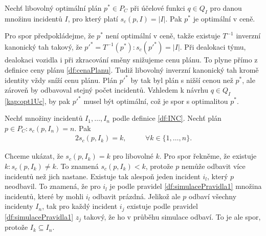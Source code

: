 \begin{veta}\label{veta:optPlanOptVCene}
  Nechť libovolný optimální plán $p^* \in P_C$ při účelové funkci $q \in Q_I$ pro danou množinu incidentů $I$, pro který platí $s_c(p, I) = |I|$.
  Pak $p^*$ je optimální v ceně.
\end{veta}
\begin{dukaz}
  Pro spor předpokládejme, že $p^*$ není optimální v ceně, takže existuje $T^{-1}$ inverzní kanonický tah takový, že $p'^* = T^{-1}(p^*) \colon s_c(p'^*) = |I|$.
  Při dealokaci týmu, dealokaci vozidla i při zkracování směny snižujeme cenu plánu. To plyne přímo z definice ceny plánu \ref{df:cenaPlanu}.
  Tudiž libovolný inverzní kanonický tah kromě identity vždy sníží cenu plánu. 
  Plán $p'^*$ by tak byl plán s nižší cenou než $p^*$, ale zároveň by odbavoval stejný počet incidentů.
  Vzhledem k návrhu $q \in Q_I$ \ref{kap:opt1Uc}, by pak $p'^*$ musel být optimální, což je spor s optimalitou $p^*$.
\end{dukaz}

\begin{veta}\label{veta:OmeneIncidentech}
  Nechť množiny incidentů $I_1, \dots, I_n$ podle definice \ref{df:INC}.
  Nechť plán $p \in P_C \colon s_c(p, I_n) = n$. Pak
  \begin{alignat*}{2}
    s_c(p, I_k) = k, \quad && \forall k \in \{ 1, \dots, n \}.
  \end{alignat*}
\end{veta}
\begin{dukaz}
  Chceme ukázat, že $s_c(p, I_k) = k$ pro libovolné $k$.
  Pro spor řekněme, že existuje $k \colon s_c(p, I_k) \neq k$.
  To znamená $s_c(p, I_k) < k$, protože $p$ nemůže odbavit více incidentů než jich nastane.
  Existuje tak alespoň jeden incident $i_l$, který $p$ neodbavil.
  To znamená, že pro $i_l$ je podle pravidel \ref{df:simulacePravidla1} množina incidentů, které by mohli $i_l$ odbavit prázdná.
  Jelikož ale $p$ odbaví všechny incidenty $I_n$, tak pro každý incident $i_j$ existuje podle pravidel \ref{df:simulacePravidla1} $z_j$ takový, že ho v průběhu simulace odbaví.
  To je ale spor, protože $I_k \subseteq I_n$.
\end{dukaz}

